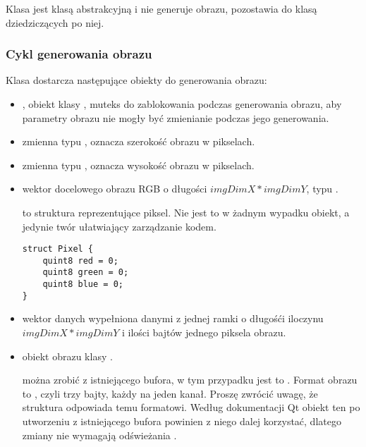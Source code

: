 

Klasa  jest klasą abstrakcyjną i nie generuje obrazu, pozostawia do klasą dziedziczących po niej.

\subsubsection{Cykl generowania obrazu}

Klasa  dostarcza następujące obiekty do generowania obrazu:
\begin{itemize}
    \item {}, obiekt klasy , muteks do zablokowania podczas generowania obrazu, aby parametry obrazu nie mogły być zmienianie podczas jego generowania.

    \item {} zmienna typu , oznacza szerokość obrazu w pikselach.

    \item {} zmienna typu , oznacza wysokość obrazu w pikselach.

    \item {} wektor docelowego obrazu RGB o długości $imgDimX*imgDimY$, typu .

           to struktura reprezentujące piksel.
          Nie jest to w żadnym wypadku obiekt, a jedynie twór ułatwiający zarządzanie kodem.

          \begin{lstlisting}
struct Pixel {
    quint8 red = 0;   
    quint8 green = 0;    
    quint8 blue = 0;   
}\end{lstlisting}

    \item {} wektor danych wypełniona danymi z jednej ramki o długośći iloczynu $imgDimX*imgDimY$ i ilości bajtów jednego piksela obrazu.

    \item {} obiekt obrazu klasy .

           można zrobić z istniejącego bufora, w tym przypadku jest to .
          Format obrazu to , czyli trzy bajty, każdy na jeden kanał.
          Proszę zwrócić uwagę, że struktura  odpowiada temu formatowi.
          Według dokumentacji Qt obiekt ten po utworzeniu z istniejącego bufora powinien z niego dalej korzystać, dlatego zmiany  nie wymagają odświeżania .


\end{itemize}
